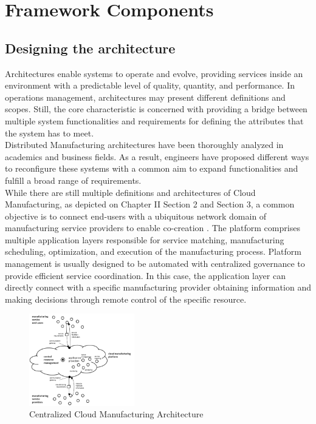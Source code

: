 \section{Framework Components}
\subsection{Designing the architecture}
Architectures enable systems to operate and evolve, providing services inside an environment with a predictable level of quality, quantity, and performance. In operations management, architectures may present different definitions and scopes. Still, the core characteristic is concerned with providing a bridge between multiple system functionalities and requirements for defining the attributes that the system has to meet.\\
Distributed Manufacturing architectures have been thoroughly analyzed in academics and business fields. As a result, engineers have proposed different ways to reconfigure these systems with a common aim to expand functionalities and fulfill a broad range of requirements.\\
While there are still multiple definitions and architectures of Cloud Manufacturing, as depicted on Chapter II Section 2 and Section 3, a common objective is to connect end-users with a ubiquitous network domain of manufacturing service providers to enable co-creation \parencite{goran_advanced_2012}. The platform comprises multiple application layers responsible for service matching, manufacturing scheduling, optimization, and execution of the manufacturing process. Platform management is usually designed to be automated with centralized governance to provide efficient service coordination. In this case, the application layer can directly connect with a specific manufacturing provider obtaining information and making decisions through remote control of the specific resource.
\begin{figure}
    \centering
    \includegraphics[height=4cm, keepaspectratio]{images/centralized-cmfg-architecture}
    \caption{Centralized Cloud Manufacturing Architecture}
    \label{fig:centralized-cmfg-architecture}
\end{figure}

